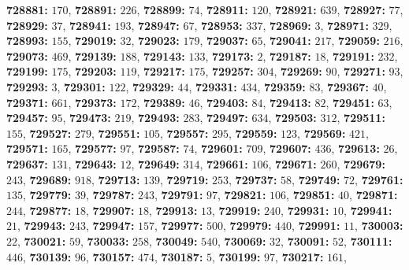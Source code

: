 \textsf{\bfseries 728881:} $170$, \textsf{\bfseries 728891:} $226$, \textsf{\bfseries 728899:} $74$, \textsf{\bfseries 728911:} $120$, \textsf{\bfseries 728921:} $639$, \textsf{\bfseries 728927:} $77$, \textsf{\bfseries 728929:} $37$, \textsf{\bfseries 728941:} $193$, \textsf{\bfseries 728947:} $67$, \textsf{\bfseries 728953:} $337$, \textsf{\bfseries 728969:} $3$, \textsf{\bfseries 728971:} $329$, \textsf{\bfseries 728993:} $155$, \textsf{\bfseries 729019:} $32$, \textsf{\bfseries 729023:} $179$, \textsf{\bfseries 729037:} $65$, \textsf{\bfseries 729041:} $217$, \textsf{\bfseries 729059:} $216$, \textsf{\bfseries 729073:} $469$, \textsf{\bfseries 729139:} $188$, \textsf{\bfseries 729143:} $133$, \textsf{\bfseries 729173:} $2$, \textsf{\bfseries 729187:} $18$, \textsf{\bfseries 729191:} $232$, \textsf{\bfseries 729199:} $175$, \textsf{\bfseries 729203:} $119$, \textsf{\bfseries 729217:} $175$, \textsf{\bfseries 729257:} $304$, \textsf{\bfseries 729269:} $90$, \textsf{\bfseries 729271:} $93$, \textsf{\bfseries 729293:} $3$, \textsf{\bfseries 729301:} $122$, \textsf{\bfseries 729329:} $44$, \textsf{\bfseries 729331:} $434$, \textsf{\bfseries 729359:} $83$, \textsf{\bfseries 729367:} $40$, \textsf{\bfseries 729371:} $661$, \textsf{\bfseries 729373:} $172$, \textsf{\bfseries 729389:} $46$, \textsf{\bfseries 729403:} $84$, \textsf{\bfseries 729413:} $82$, \textsf{\bfseries 729451:} $63$, \textsf{\bfseries 729457:} $95$, \textsf{\bfseries 729473:} $219$, \textsf{\bfseries 729493:} $283$, \textsf{\bfseries 729497:} $634$, \textsf{\bfseries 729503:} $312$, \textsf{\bfseries 729511:} $155$, \textsf{\bfseries 729527:} $279$, \textsf{\bfseries 729551:} $105$, \textsf{\bfseries 729557:} $295$, \textsf{\bfseries 729559:} $123$, \textsf{\bfseries 729569:} $421$, \textsf{\bfseries 729571:} $165$, \textsf{\bfseries 729577:} $97$, \textsf{\bfseries 729587:} $74$, \textsf{\bfseries 729601:} $709$, \textsf{\bfseries 729607:} $436$, \textsf{\bfseries 729613:} $26$, \textsf{\bfseries 729637:} $131$, \textsf{\bfseries 729643:} $12$, \textsf{\bfseries 729649:} $314$, \textsf{\bfseries 729661:} $106$, \textsf{\bfseries 729671:} $260$, \textsf{\bfseries 729679:} $243$, \textsf{\bfseries 729689:} $918$, \textsf{\bfseries 729713:} $139$, \textsf{\bfseries 729719:} $253$, \textsf{\bfseries 729737:} $58$, \textsf{\bfseries 729749:} $72$, \textsf{\bfseries 729761:} $135$, \textsf{\bfseries 729779:} $39$, \textsf{\bfseries 729787:} $243$, \textsf{\bfseries 729791:} $97$, \textsf{\bfseries 729821:} $106$, \textsf{\bfseries 729851:} $40$, \textsf{\bfseries 729871:} $244$, \textsf{\bfseries 729877:} $18$, \textsf{\bfseries 729907:} $18$, \textsf{\bfseries 729913:} $13$, \textsf{\bfseries 729919:} $240$, \textsf{\bfseries 729931:} $10$, \textsf{\bfseries 729941:} $21$, \textsf{\bfseries 729943:} $243$, \textsf{\bfseries 729947:} $157$, \textsf{\bfseries 729977:} $500$, \textsf{\bfseries 729979:} $440$, \textsf{\bfseries 729991:} $11$, \textsf{\bfseries 730003:} $22$, \textsf{\bfseries 730021:} $59$, \textsf{\bfseries 730033:} $258$, \textsf{\bfseries 730049:} $540$, \textsf{\bfseries 730069:} $32$, \textsf{\bfseries 730091:} $52$, \textsf{\bfseries 730111:} $446$, \textsf{\bfseries 730139:} $96$, \textsf{\bfseries 730157:} $474$, \textsf{\bfseries 730187:} $5$, \textsf{\bfseries 730199:} $97$, \textsf{\bfseries 730217:} $161$, 
